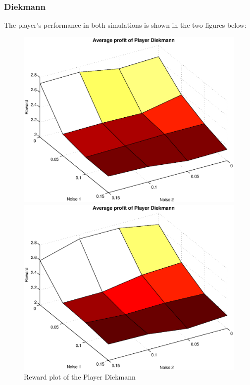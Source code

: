 \documentclass[11pt,twoside]{article}
\begin{document}
\subsubsection{Diekmann}
The player's performance in both simulations is shown in the two figures below:
\begin{figure}[h]

\begin{minipage}[hbt]{0.65\textwidth}
	\centering
	\includegraphics[width=\textwidth]{pics/simulation1/Reward_vs_Noise_of_Player_Diekmann}
\end{minipage}
\hfill
\begin{minipage}[hbt]{0.3\textwidth}
	\centering
	\includegraphics[width=\textwidth]{pics/simulation2/Reward_vs_Noise_of_Player_Diekmann}
\end{minipage}
	\caption{Reward plot of the Player Diekmann}
	\label{pic player diekmann}
\end{figure}
\end{document}
